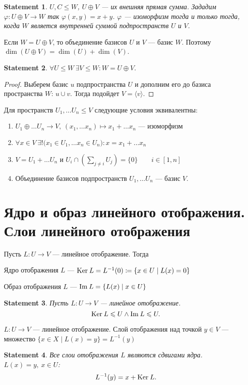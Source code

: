 \documentclass[11pt]{book}
\renewcommand{\le}{\leqslant}
\newcommand{\im}{{\mathop{\text{\rm Im}}}\:}
\renewcommand{\ker}{{\mathop{\text{\rm Ker}}}\:}
\theoremstyle{definition}
\theoremstyle{plain}
\theoremstyle{plain}
\newtheorem{st}{Statement}
\theoremstyle{definition}
\theoremstyle{remark}
\begin{document}
\begin{st}
    $ U, C \le W$, $ U \oplus V$ --- их внешняя прямая сумма. Зададим  $ \varphi : U \oplus V \to W$ так $ \varphi (x, y) = x + y$. $ \varphi $ --- изоморфизм тогда и только тогда, когда $ W $ является внутренней суммой подпространств  $ U$ и  $ V$.
\end{st}
Если $ W = U \oplus V$, то объединение базисов  $ U$ и  $ V$ --- базис  $ W$. Поэтому  $ \dim(U \oplus V) = \dim(U) + \dim(V)$.
\begin{st}
    $ \forall U \le W ~ \exists V \le W: W = U \oplus V$.
\end{st}
\begin{proof}
    Выберем базис  $ u$ подпространства  $ U$ и дополним его до базиса пространства  $ W$: $ u \cup v$. Тогда подойдет $ V = \langle v \rangle$.
\end{proof}
\begin{thm}
    Для пространств $ U_1, \ldots U_n \le V$ следующие условия эквивалентны:
    \begin{enumerate}[noitemsep,label={\rm (\arabic*)}]
	\item  $ U_1 \oplus \ldots U_n \to V, ~ (x_1, \ldots x_n) \mapsto x_1 + \ldots x_n$ --- изоморфизм
	\item $ \forall x \in V ~ \exists ! \bigl(x_1 \in U_1, \ldots x_n \in U_n\bigr): x =x_1 + \ldots x_n$
	\item $ V = U_1+ \ldots U_n$ и $ U_i \cap \left( \sum_{j\ne i}U_{j} \right)=\{0\} \qquad i \in [1, n]$
	\item Объединение базисов подпространств $ U_1, \ldots U_n$ --- базис $ V$.
    \end{enumerate}
\end{thm}
\section{Ядро и образ линейного отображения. Слои линейного отображения}
\begin{defn}
    Пусть $ L: U \to V$ --- линейное отображение. Тогда
    \begin{description}[noitemsep]
	\item {\sf Ядро отображения $ L$ --- }  $ \ker L = L^{-1}(0) \coloneqq \{x \in U \mid L(x) = 0\}$
	\item {\sf Образ отображения $ L$ --- } $ \im L = \{L(x) \mid x \in U\}$
    \end{description}
\end{defn}
\begin{st}
    Пусть $ L: U \to  V$ --- линейное отображение.
    \[
	\ker L \le U \wedge  \im  L \le U
    .\]
\end{st}
\begin{defn}
    $ L : U \to  V$ --- линейное отображение.
    {\sf Слой} отображения над точкой $ y \in V$ --- множество $ \{x \in X\mid L(x) = y\} = L^{-1} (y)$
\end{defn}
\begin{st}
    Все слои отображения $ L$ являются сдвигами ядра.  $ L(x) = y, ~ x \in U$:
    \[
	L^{-1}(y) = x + \ker L
    .\]
\end{st}
\end{document}
